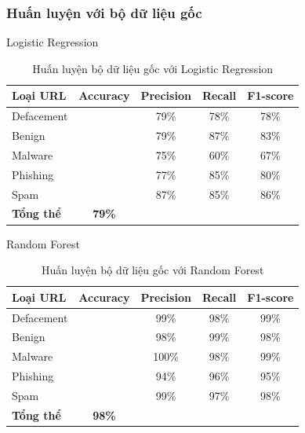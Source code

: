 \documentclass[13pt]{article}
\begin{document}
\subsubsection{Huấn luyện với bộ dữ liệu gốc}
Logistic Regression
\begin{table}[h]
    \centering
    \renewcommand{\arraystretch}{1.3} %
    \begin{tabular}{|l|c|c|c|c|}
        \hline
        \rowcolor[HTML]{C0C0C0} %
        \textbf{Loại URL} & \textbf{Accuracy} & \textbf{Precision} & \textbf{Recall} & \textbf{F1-score} \\ 
        \hline
        Defacement &  & 79\% & 78\% & 78\% \\ 
        \hline
        Benign &  & 79\% & 87\% & 83\% \\ 
        \hline
        Malware &  & 75\% & 60\% & 67\% \\ 
        \hline
        Phishing &  & 77\% & 85\% & 80\% \\ 
        \hline
        Spam &  & 87\% & 85\% & 86\% \\ 
        \hline
        \textbf{Tổng thể} & \textbf{79\%} &  &  &  \\ 
        \hline
    \end{tabular}
    \caption{Huấn luyện bộ dữ liệu gốc với Logistic Regression}
    \label{tab:logistic_regression}
\end{table}

Random Forest
\begin{table}[h]
    \centering
    \renewcommand{\arraystretch}{1.3} %
    \begin{tabular}{|l|c|c|c|c|}
        \hline
        \rowcolor[HTML]{C0C0C0} %
        \textbf{Loại URL} & \textbf{Accuracy} & \textbf{Precision} & \textbf{Recall} & \textbf{F1-score} \\ 
        \hline
        Defacement &  & 99\% & 98\% & 99\% \\ 
        \hline
        Benign &  & 98\% & 99\% & 98\% \\ 
        \hline
        Malware &  & 100\% & 98\% & 99\% \\ 
        \hline
        Phishing &  & 94\% & 96\% & 95\% \\ 
        \hline
        Spam &  & 99\% & 97\% & 98\% \\ 
        \hline
        \textbf{Tổng thể} & \textbf{98\%} &  &  &  \\ 
        \hline
    \end{tabular}
    \caption{Huấn luyện bộ dữ liệu gốc với Random Forest}
    \label{tab:logistic_regression}
\end{table}
\end{document}
